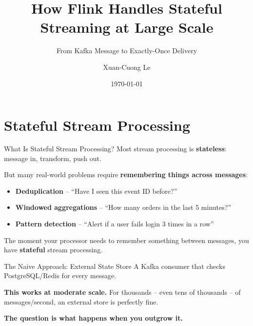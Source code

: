 \documentclass[aspectratio=169]{beamer}
\author{Xuan-Cuong Le}
\title[Flink Stateful Streaming]{How Flink Handles Stateful Streaming at Large Scale}
\subtitle{From Kafka Message to Exactly-Once Delivery}
\institute{cuongkane.com}
\date{\today}
\begin{document}
\begin{frame}
    {\small
    \titlepage
    }
\end{frame}

\section{Stateful Stream Processing}

\begin{frame}{What Is Stateful Stream Processing?}
    Most stream processing is \textbf{stateless}: message in, transform, push out.

    \vspace{0.3cm}
    But many real-world problems require \textbf{remembering things across messages}:
    \begin{itemize}
        \item \textbf{Deduplication} -- ``Have I seen this event ID before?''
        \item \textbf{Windowed aggregations} -- ``How many orders in the last 5 minutes?''
        \item \textbf{Pattern detection} -- ``Alert if a user fails login 3 times in a row''
    \end{itemize}

    \vspace{0.3cm}
    \colorbox{utu_green!20}{\parbox{0.9\textwidth}{
        \centering
        The moment your processor needs to remember something between messages, you have \textbf{stateful} stream processing.
    }}
\end{frame}

\begin{frame}{The Naive Approach: External State Store}
    A Kafka consumer that checks PostgreSQL/Redis for every message.

    \vspace{0.3cm}
    \textbf{This works at moderate scale.} For thousands -- even tens of thousands -- of messages/second, an external store is perfectly fine.

    \vspace{0.3cm}
    \begin{center}
        \textbf{The question is what happens when you outgrow it.}
    \end{center}
\end{frame}
\end{document}
